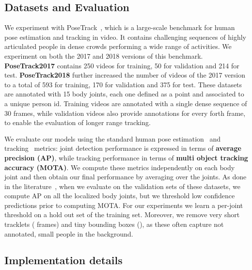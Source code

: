 \documentclass[10pt,twocolumn,letterpaper]{article}
\begin{document}
\subsection {Datasets and Evaluation}
We experiment with PoseTrack~\cite{PoseTrack}, which is a large-scale benchmark for human pose estimation and tracking in video. It contains challenging sequences of highly articulated people in dense crowds performing a wide range of activities.
We experiment on both the 2017 and 2018 versions of this benchmark. 
{\bf PoseTrack2017} contains 250 videos for training, 50 for validation and 214 for test. {\bf PoseTrack2018} further increased the number of videos of the 2017 version to a total of 593 for training, 170 for validation and 375 for test. 
These datasets are annotated with 15 body joints, each one defined as a point and associated to a unique person id. Training videos are annotated with a single dense sequence of 30 frames, while validation videos also provide annotations for every forth frame, to enable the evaluation of longer range tracking. 

We evaluate our models using the standard human pose estimation~\cite{pishchulin16cvpr,lin2014microsoft,ronchi17iccv} and tracking~\cite{milan2016mot16,PoseTrack} metrics: joint detection performance is expressed in terms of {\bf average precision (AP)}, while tracking performance in terms of {\bf multi object tracking accuracy (MOTA)}. We compute these metrics independently on each body joint and then obtain our final performance by averaging over the joints. As done in the literature~\cite{girdhar2018detecttrack, xiao2018simple, sun2019deep}, when we evaluate on the validation sets of these datasets, we compute AP on all the localized body joints, but we threshold low confidence predictions prior to computing MOTA.
For our experiments we learn a per-joint threshold on a hold out set of the training set. Moreover, we remove very short tracklets ( frames) and tiny bounding boxes (), as these often capture not annotated, small people in the background.

\subsection {Implementation details}\label{sec:impl_details}
\end{document}
